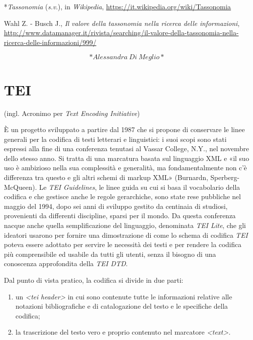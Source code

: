 \documentclass[
  b5paper,
  twoside,
  12pt,
  chapterprefix=false,
  bibliography=totocnumbered,
  parskip=false]{scrbook}
\begin{document}
*\emph{Tassonomia} (\emph{s.v}.), in \emph{Wikipedia},
\url{https://it.wikipedia.org/wiki/Tassonomia}

Wahl Z. - Busch J., \emph{Il valore della tassonomia nella ricerca delle
informazioni},
\url{http://www.datamanager.it/rivista/searching/il-valore-della-tassonomia-nella-ricerca-delle-informazioni/999/}

\[*Alessandra~Di~Meglio*\]

\hypertarget{tei}{%
\chapter{TEI}\label{tei}}

(ingl. Acronimo per \emph{Text Encoding Initiative})

È un progetto sviluppato a partire dal 1987 che si propone di conservare
le linee generali per la codifica di testi letterari e linguistici: i
suoi scopi sono stati espressi alla fine di una conferenza tenutasi al
Vassar College, N.Y., nel novembre dello stesso anno. Si tratta di una
marcatura basata sul linguaggio XML e «il suo uso è ambizioso nella sua
complessità e generalità, ma fondamentalmente non c'è differenza tra
questo e gli altri schemi di markup XML» (Burnardn, Sperberg-McQueen).
Le \emph{TEI Guidelines}, le linee guida su cui si basa il vocabolario della
codifica e che gestisce anche le regole gerarchiche, sono state rese
pubbliche nel maggio del 1994, dopo sei anni di sviluppo gestito da
centinaia di studiosi, provenienti da differenti discipline, sparsi per
il mondo. Da questa conferenza nacque anche quella semplificazione del
linguaggio, denominata \emph{TEI Lite}, che gli ideatori usarono per fornire
una dimostrazione di come lo schema di codifica \emph{TEI} poteva essere
adottato per servire le necessità dei testi e per rendere la codifica
più comprensibile ed usabile da tutti gli utenti, senza il bisogno di
una conoscenza approfondita della \emph{TEI DTD}.

Dal punto di vista pratico, la codifica si divide in due parti:

\begin{enumerate}
\def\labelenumi{\arabic{enumi}.}
\item
  un \emph{\textless tei header\textgreater{}} in cui sono contenute tutte le informazioni
  relative alle notazioni bibliografiche e di catalogazione del testo
  e le specifiche della codifica;
\item
  la trascrizione del testo vero e proprio contenuto nel marcatore
  \emph{\textless text\textgreater.}
\end{enumerate}
\end{document}
